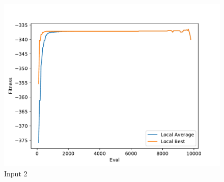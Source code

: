 \documentclass{standalone}
\begin{document}
\begin{figure}[!htb]
	\caption{Input 2}
	\label{fig:graph_2039}
	\includegraphics[width=\textwidth]{../graphs/graphs/2039.pdf}
\end{figure}
\end{document}
